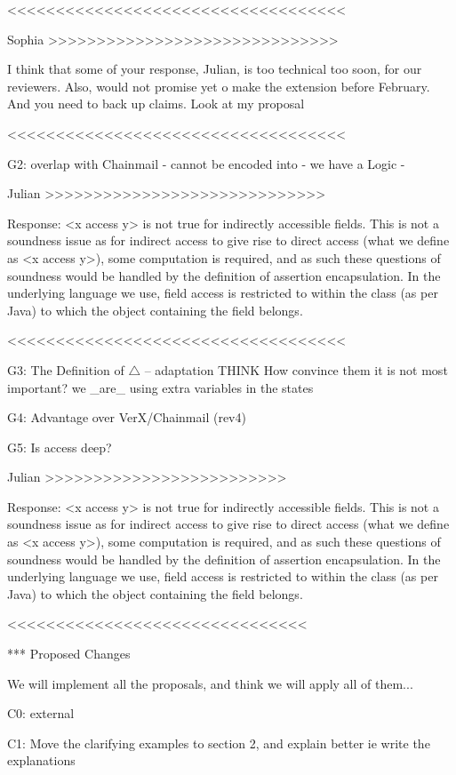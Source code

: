 <<<<<<<<<<<<<<<<<<<<<<<<<<<<<<<<<<<

Sophia >>>>>>>>>>>>>>>>>>>>>>>>>>>>>>

I think that some of your response, Julian, is too technical too soon, for our reviewers. Also, would not promise yet o make the extension before February. And you need to back up claims. Look at my proposal

<<<<<<<<<<<<<<<<<<<<<<<<<<<<<<<<<<<

G2:  overlap with Chainmail
- cannot be encoded into
- we have a Logic
- %

Julian >>>>>>>>>>>>>>>>>>>>>>>>>>>>>

Response: <x access y> is not true for indirectly accessible fields. This is not a soundness issue as for indirect access to give rise to direct access (what we define as <x access y>), some computation is required, and as such these questions of soundness would be handled by the definition of assertion encapsulation. In the underlying language we use, field access is restricted to within the class (as per Java) to which the object containing the field belongs.

<<<<<<<<<<<<<<<<<<<<<<<<<<<<<<<<<<<

G3: The Definition of $\triangle$ -- adaptation
THINK
How convince them it is not most important?
we _are_ using extra variables in the states

G4: Advantage over VerX/Chainmail (rev4)

G5: Is access deep?

Julian >>>>>>>>>>>>>>>>>>>>>>>>>

Response: <x access y> is not true for indirectly accessible fields. This is not a soundness issue as for indirect access to give rise to direct access (what we define as <x access y>), some computation is required, and as such these questions of soundness would be handled by the definition of assertion encapsulation. In the underlying language we use, field access is restricted to within the class (as per Java) to which the object containing the field belongs.

<<<<<<<<<<<<<<<<<<<<<<<<<<<<<<<


*** Proposed Changes

We will implement all the proposals, and think we will apply all of them...

C0: external

C1: Move the clarifying examples to section 2, and explain better
ie write the explanations

